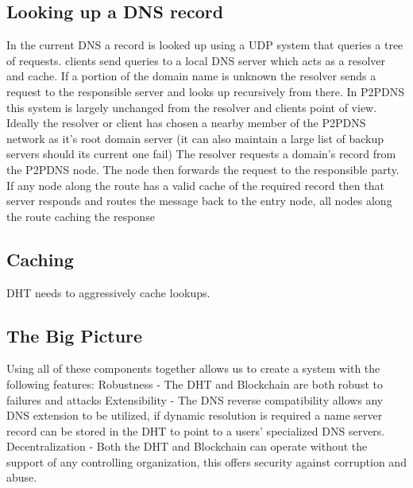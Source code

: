 \documentclass[11pt]{ieeetran} %
\begin{document}
\subsection{Looking up a DNS record}
In the current DNS a record is looked up using a UDP system that queries a tree of requests. clients send queries to a local DNS server which acts as a resolver and cache. If a portion of the domain name is unknown the resolver sends a request to the responsible server and looks up recursively from there.
In P2PDNS this system is largely unchanged from the resolver and clients point of view. Ideally the resolver or client has chosen a nearby member of the P2PDNS network as it’s root domain server (it can also maintain a large list of backup servers should its current one fail) The resolver requests a domain’s record from the P2PDNS node. The node then forwards the request to the responsible party. If any node along the route has a valid cache of the required record then that server responds and routes the message back to the entry node, all nodes along the route caching the response

\subsection{Caching}

DHT needs to aggressively cache lookups.  \cite{irm}

\subsection{The Big Picture}
Using all of these components together allows us to create a system with the following features:
Robustness - The DHT and Blockchain are both robust to failures and attacks
Extensibility - The DNS reverse compatibility allows any DNS extension to be utilized, if dynamic resolution is required a name server record can be stored in the DHT to point to a users’ specialized DNS servers.
Decentralization - Both the DHT and Blockchain can operate without the support of any controlling organization, this offers security against corruption and abuse.
	


\end{document}
